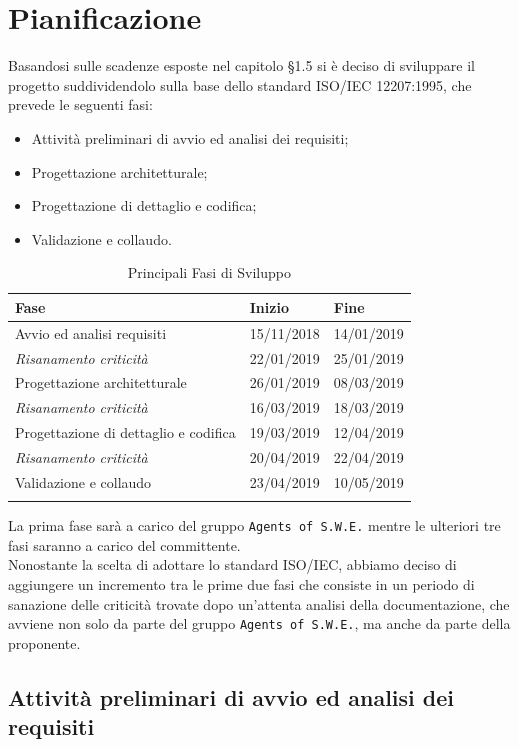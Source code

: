 \section{Pianificazione}

Basandosi sulle scadenze esposte nel capitolo §1.5 si è deciso di sviluppare il progetto suddividendolo sulla base dello standard ISO/IEC 12207:1995, che prevede le seguenti fasi:
\begin{itemize}
	\item Attività preliminari di avvio ed analisi dei requisiti;
	\item Progettazione architetturale;
	\item Progettazione di dettaglio e codifica;
	\item Validazione e collaudo.
\end{itemize}

\begin{longtable}{|C{.46\textwidth}|C{.20\textwidth}|C{.20\textwidth}|}
\hline
\textbf{Fase} & \textbf{Inizio} & \textbf{Fine}\\
\hline \hline
\endfirsthead
\hline
Avvio ed analisi requisiti & 15/11/2018 & 14/01/2019 \\
\hline
\textit{Risanamento criticità} & 22/01/2019 & 25/01/2019 \\
\hline
Progettazione architetturale & 26/01/2019 & 08/03/2019 \\
\hline
\textit{Risanamento criticità} & 16/03/2019 & 18/03/2019 \\
\hline
Progettazione di dettaglio e codifica & 19/03/2019 & 12/04/2019 \\
\hline
\textit{Risanamento criticità} & 20/04/2019 & 22/04/2019 \\
\hline
Validazione e collaudo & 23/04/2019 & 10/05/2019 \\
\hline
\caption{Principali Fasi di Sviluppo}
\label{Tabella Fasi di Sviluppo}
\end{longtable}

La prima fase sarà a carico del gruppo \texttt{Agents of S.W.E.} mentre le ulteriori tre fasi saranno a carico del committente. \\
Nonostante la scelta di adottare lo standard ISO/IEC, abbiamo deciso di aggiungere un incremento tra le prime due fasi che consiste in un periodo di sanazione delle criticità trovate dopo un'attenta analisi della documentazione, che avviene non solo da parte del gruppo \texttt{Agents of S.W.E.}, ma anche da parte della proponente. 

\subsection{Attività preliminari di avvio ed analisi dei requisiti}

